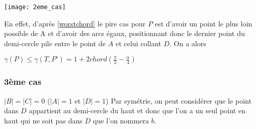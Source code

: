 \texttt{[image: 2eme\_cas]}

En effet, d'après \ref{worstchord} le pire cas pour $P$ est d'avoir un point le plus loin possible de A et d'avoir des arcs égaux, positionnant donc le dernier point du demi-cercle pile entre le point de $A$ et celui collant $D$. On a alors

$\gamma(P) \leq \gamma(T, P') = 1 + 2chord(\frac{\pi}{2} - \frac{\alpha}{4})$

\subsubsection*{3ème cas} $|B| = |C| = 0$ ($|A| = 1$ et $|D| = 1$)
Par symétrie, on peut considérer que le point dans $D$ appartient au demi-cercle du haut et donc que l'on a un seul point en haut qui ne soit pas dans $D$ que l'on nommera $b$.

